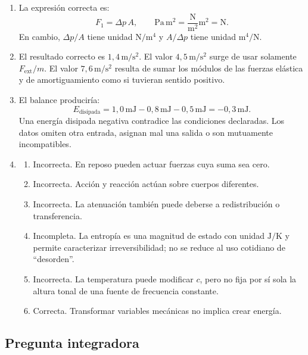 \begin{enumerate}[label=\textbf{D\arabic*.},leftmargin=*]
    \item La expresión correcta es:
    \[
        F_1=\Delta p\,A,
        \qquad
        \text{Pa}\,\text{m}^{2}
        =\frac{\text{N}}{\text{m}^{2}}\text{m}^{2}
        =\text{N}.
    \]
    En cambio, \(\Delta p/A\) tiene unidad
    \(\text{N}/\text{m}^{4}\) y \(A/\Delta p\) tiene unidad
    \(\text{m}^{4}/\text{N}\).

    \item El resultado correcto es
    \(1{,}4\,\text{m}/\text{s}^{2}\). El valor
    \(4{,}5\,\text{m}/\text{s}^{2}\) surge de usar solamente
    \(F_\mathrm{ext}/m\). El valor
    \(7{,}6\,\text{m}/\text{s}^{2}\) resulta de sumar los módulos de las fuerzas
    elástica y de amortiguamiento como si tuvieran sentido positivo.

    \item El balance produciría:
    \[
        E_\mathrm{disipada}
        =1{,}0\,\text{mJ}-0{,}8\,\text{mJ}-0{,}5\,\text{mJ}
        =-0{,}3\,\text{mJ}.
    \]
    Una energía disipada negativa contradice las condiciones declaradas. Los
    datos omiten otra entrada, asignan mal una salida o son mutuamente
    incompatibles.

    \item
    \begin{enumerate}[label=\alph*)]
        \item Incorrecta. En reposo pueden actuar fuerzas cuya suma sea cero.
        \item Incorrecta. Acción y reacción actúan sobre cuerpos diferentes.
        \item Incorrecta. La atenuación también puede deberse a redistribución o
        transferencia.
        \item Incompleta. La entropía es una magnitud de estado con unidad
        \(\text{J}/\text{K}\) y permite caracterizar irreversibilidad; no se
        reduce al uso cotidiano de ``desorden''.
        \item Incorrecta. La temperatura puede modificar \(c\), pero no fija por
        sí sola la altura tonal de una fuente de frecuencia constante.
        \item Correcta. Transformar variables mecánicas no implica crear
        energía.
    \end{enumerate}
\end{enumerate}

\subsection*{Pregunta integradora}

